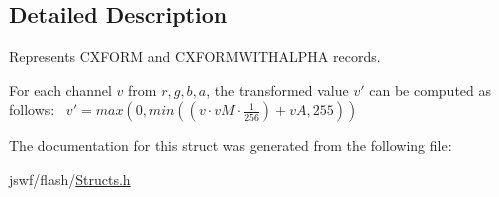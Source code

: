 \subsection{Detailed Description}
Represents {\ttfamily C\+X\+F\+O\+R\+M} and {\ttfamily C\+X\+F\+O\+R\+M\+W\+I\+T\+H\+A\+L\+P\+H\+A} records. 

For each channel $v$ from ${r,g,b,a}$, the transformed value $v'$ can be computed as follows\+:~\newline
 $v' = max(0, min((v \cdot vM \cdot \frac{1}{256}) + vA, 255))$ 

The documentation for this struct was generated from the following file\+:\begin{DoxyCompactItemize}
\item 
jswf/flash/\hyperlink{_structs_8h}{Structs.\+h}\end{DoxyCompactItemize}
